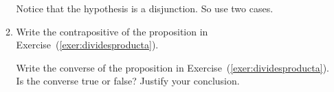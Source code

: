 \begin{enumerate}
\begin{enumerate}
\hint  Notice that the hypothesis is a disjunction.  So use two cases. 
\label{exer:dividesproducta}%

  \item Write the contrapositive of the proposition in Exercise~(\ref{exer:dividesproducta}).

  \yitem Write the converse of the proposition in Exercise~(\ref{exer:dividesproducta}).  Is the converse true or false?  Justify your conclusion.
\label{exer:dividesproductc}%
  \end{enumerate}


%
%
%

%


%


\end{enumerate}
